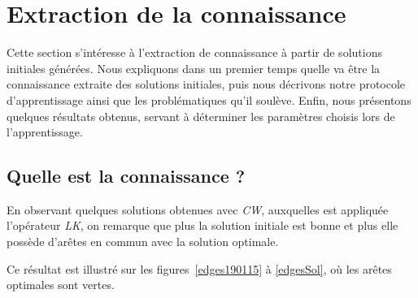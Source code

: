 \documentclass[a4paper,11pt]{article}%
\begin{document}
\section{Extraction de la connaissance}
\label{extraction}
Cette section s'intéresse à l'extraction de connaissance à partir de solutions initiales générées. 
Nous expliquons dans un premier temps quelle va être la connaissance extraite des solutions initiales, puis nous décrivons notre protocole d'apprentissage ainsi que les problématiques qu'il soulève.
Enfin, nous présentons quelques résultats obtenus, servant à déterminer les paramètres choisis lors de l'apprentissage. 

\subsection{Quelle est la connaissance ?}

En observant quelques solutions obtenues avec \emph{CW}, auxquelles est appliquée l'opérateur \emph{LK}, on remarque que plus la solution initiale est bonne et plus elle possède d'arêtes en commun avec la solution optimale. 

Ce résultat est illustré sur les figures~\ref{edges190115} à \ref{edgesSol}, où les arêtes optimales sont vertes.
\end{document}
